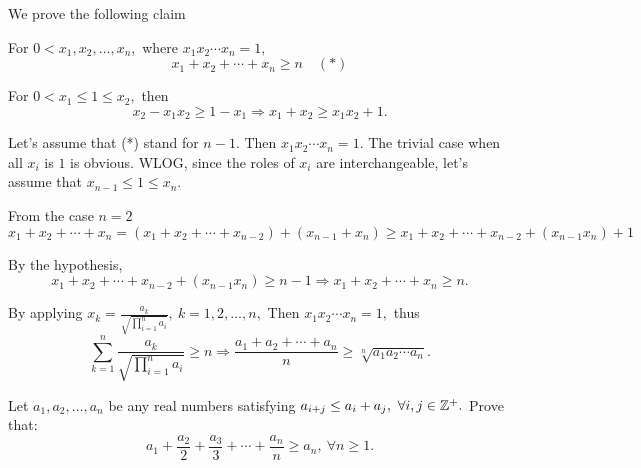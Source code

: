 \documentclass{article}
\begin{document}
\begin{soln}
    We prove the following claim
    \begin{claim*}
        For $0< x_1, x_2, \ldots, x_n,$ where $x_1 x_2 \cdots x_n = 1,$ 
        \[
            x_1 + x_2 + \cdots + x_n \ge n \quad (*)
        \]
    \end{claim*}
    \begin{subproof}
        For $0< x_1 \le 1 \le x_2,$ then
        \[
            x_2 - x_1x_2 \ge 1 - x_1 \Rightarrow x_1 + x_2 \ge x_1x_2 + 1.
        \]
        
        Let's assume that (*) stand for $n-1.$ Then $x_1 x_2 \cdots x_n = 1.$
        The trivial case when all $x_i$ is $1$ is obvious.
        WLOG, since the roles of $x_i$ are interchangeable, let's assume that $x_{n-1} \le 1 \le x_{n}.$

        From the case $n=2$
        \[
            x_1 + x_2 + \cdots + x_n = (x_1 + x_2 + \cdots + x_{n-2})  + (x_{n-1}+x_n) 
            \ge x_1 + x_2 + \cdots + x_{n-2} + (x_{n-1}x_n) + 1
        \]

        By the hypothesis,
        \[
            x_1 + x_2 + \cdots + x_{n-2} + (x_{n-1}x_n) \ge n-1 \Rightarrow x_1 + x_2 + \cdots + x_n \ge n.
        \]
    \end{subproof}
    
    By applying $x_k = \frac{a_k}{\sqrt{\prod_{i=1}^{n} a_i}},\ k=1,2,\ldots,n,$
    Then $x_1 x_2 \cdots x_n = 1,$ thus 
    \[
        \sum_{k=1}^{n} \frac{a_k}{\sqrt{\prod_{i=1}^{n} a_i}} \ge n \Rightarrow \frac{a_1+a_2+\cdots+a_n}{n} \ge \sqrt[n]{a_1a_2 \cdots a_n}.
    \]
\end{soln}

\begin{problem}
    \label{problem:23-24-s5-o-p7}
    Let $a_1, a_2, \ldots, a_n$ be any real numbers satisfying $a_{i+j} \le a_i + a_j,\ \forall i, j \in \mathbb Z^+.$ Prove that:
    \[
        a_1 + \frac{a_2}{2} + \frac{a_3}{3} + \cdots + \frac{a_n}{n} \ge a_n,\ \forall n \ge 1.
    \]
\end{problem}
\end{document}
